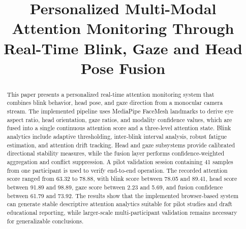 \documentclass[conference]{IEEEtran}
\begin{document}
\title{Personalized Multi-Modal Attention Monitoring Through Real-Time Blink, Gaze and Head Pose Fusion}

\author{
\and
{}
\and
{}
}

\maketitle

\begin{abstract}
This paper presents a personalized real-time attention monitoring system that combines blink behavior, head pose, and gaze direction from a monocular camera stream. The implemented pipeline uses MediaPipe FaceMesh landmarks to derive eye aspect ratio, head orientation, gaze ratios, and modality confidence values, which are fused into a single continuous attention score and a three-level attention state. Blink analytics include adaptive thresholding, inter-blink interval analysis, robust fatigue estimation, and attention drift tracking. Head and gaze subsystems provide calibrated directional stability measures, while the fusion layer performs confidence-weighted aggregation and conflict suppression. A pilot validation session containing 41 samples from one participant is used to verify end-to-end operation. The recorded attention score ranged from 63.32 to 78.88, with blink score between 78.05 and 89.41, head score between 91.89 and 98.89, gaze score between 2.23 and 5.69, and fusion confidence between 61.79 and 73.92. The results show that the implemented browser-based system can generate stable descriptive attention analytics suitable for pilot studies and draft educational reporting, while larger-scale multi-participant validation remains necessary for generalizable conclusions.
\end{abstract}
\end{document}
